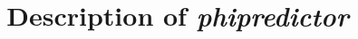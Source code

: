 \def\BibTeX{{\rm B\kern-.05em{\sc i\kern-.025em b}\kern-.08em
    T\kern-.1667em\lower.7ex\hbox{E}\kern-.125emX}}

\usepackage{./packages}

\title{Description of \textit{phipredictor}}

